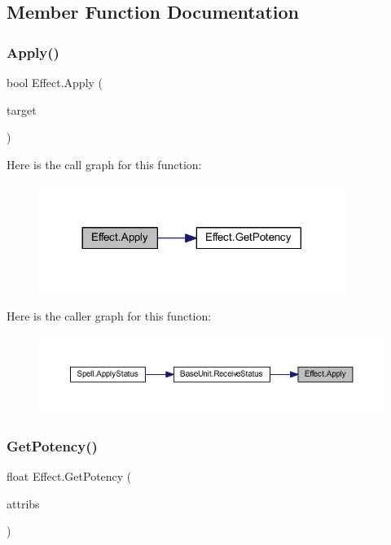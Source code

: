 \subsection{Member Function Documentation}
\mbox{\label{class_effect_a81689f18a4d3ae57ca39b71592be76ef}} 
\subsubsection{\texorpdfstring{Apply()}{Apply()}}
{\footnotesize\ttfamily bool Effect.\+Apply (\begin{DoxyParamCaption}\item[{\mbox{\hyperlink{class_base_unit}{Base\+Unit}}}]{target }\end{DoxyParamCaption})}

Here is the call graph for this function\+:\nopagebreak
\begin{figure}[H]
\begin{center}
\leavevmode
\includegraphics[width=281pt]{class_effect_a81689f18a4d3ae57ca39b71592be76ef_cgraph}
\end{center}
\end{figure}
Here is the caller graph for this function\+:\nopagebreak
\begin{figure}[H]
\begin{center}
\leavevmode
\includegraphics[width=350pt]{class_effect_a81689f18a4d3ae57ca39b71592be76ef_icgraph}
\end{center}
\end{figure}
\mbox{\label{class_effect_a5af13ce8f65df2bfbba422a46e627fc0}} 
\subsubsection{\texorpdfstring{GetPotency()}{GetPotency()}}
{\footnotesize\ttfamily float Effect.\+Get\+Potency (\begin{DoxyParamCaption}\item[{\mbox{\hyperlink{class_attributes}{Attributes}}}]{attribs }\end{DoxyParamCaption})}

